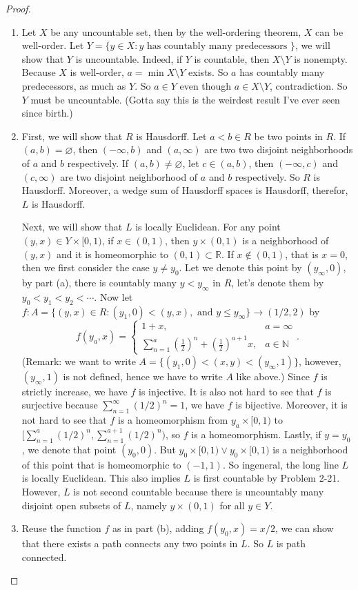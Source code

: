 \documentclass[12pt, a4paper]{article}
\theoremstyle{plain}
\newcommand{\N}{\mathbb{N}}
\newcommand{\R}{\mathbb{R}}
\begin{document}
	\begin{proof}
	\hfill
	\begin{enumerate}[label=(\alph*)]
	\item Let $X$ be any uncountable set, then by the well-ordering theorem, $X$ can be well-order. Let $Y=\{y\in X: y\text{ has countably many predecessors }\}$, we will show that $Y$ is uncountable. Indeed, if $Y$ is countable, then $X\setminus Y$ is nonempty. Because $X$ is well-order, $a=\min X\setminus Y$ exists. So $a$ has countably many predecessors, as much as $Y$. So $a\in Y$ even though $a\in X\setminus Y$, contradiction. So $Y$ must be uncountable. (Gotta say this is the weirdest result I've ever seen since birth.)
	\item First, we will show that $R$ is Hausdorff. Let $a<b\in R$ be two points in $R$. If $(a,b)=\varnothing$, then $(-\infty,b)$ and $(a,\infty)$ are two two disjoint neighborhoods of $a$ and $b$ respectively. If $(a,b)\neq \varnothing$, let $c\in (a,b)$, then $(-\infty,c)$ and $(c,\infty)$ are two disjoint neighborhood of $a$ and $b$ respectively. So $R$ is Hausdorff. Moreover, a wedge sum of Hausdorff spaces is Hausdorff, therefor, $L$ is Hausdorff.
	
	Next, we will show that $L$ is locally Euclidean. For any point $(y,x)\in Y\times [0,1)$, if $x\in (0,1)$, then $y\times (0,1)$ is a neighborhood of $(y,x)$ and it is homeomorphic to $(0,1)\subset \R$. If $x\notin (0,1)$, that is $x=0$, then we first consider the case $y\neq y_0$. Let we denote this point by $(y_\infty,0)$, by part (a), there is countably many $y<y_\infty$ in $R$, let's denote them by $y_0<y_1<y_2<\cdots$. Now let $f:A=\{(y,x)\in R:(y_1,0)<(y,x),\text{ and }y\leq y_\infty\}\rightarrow (1/2, 2)$ by
	\[
	f(y_a,x)=
	\begin{cases}
	1+x, & a=\infty\\
	\sum_{n=1}^{a}{\left(\frac{1}{2}\right)^n}+\left(\frac{1}{2}\right)^{a+1}x, & a\in \N
	\end{cases}.
	\]
	(Remark: we want to write $A=\{(y_1,0)<(x,y)<(y_\infty,1)\}$, however, $(y_\infty,1)$ is not defined, hence we have to write $A$ like above.) Since $f$ is strictly increase, we have $f$ is injective. It is also not hard to see that $f$ is surjective because $\sum_{n=1}^{\infty}{(1/2)^n}=1$, we have $f$ is bijective. Moreover, it is not hard to see that $f$ is a homeomorphism from $y_a\times [0,1)$ to $[\sum_{n=1}^{a}{(1/2)^n},\sum_{n=1}^{a+1}{(1/2)^n})$, so $f$ is a homeomorphism. Lastly, if $y=y_0$, we denote that point $(y_0,0)$. But $y_0\times [0,1)\vee y_0\times [0,1)$ is a neighborhood of this point that is homeomorphic to $(-1,1)$. So ingeneral, the long line $L$ is locally Euclidean. This also implies $L$ is first countable by Problem 2-21. However, $L$ is not second countable because there is uncountably many disjoint open subsets of $L$, namely $y\times (0,1)$ for all $y\in Y$.
	
	\item Reuse the function $f$ as in part (b), adding $f(y_0,x)=x/2$, we can show that there exists a path connects any two points in $L$. So $L$ is path connected.
	\end{enumerate}
	\end{proof}
\end{document}
